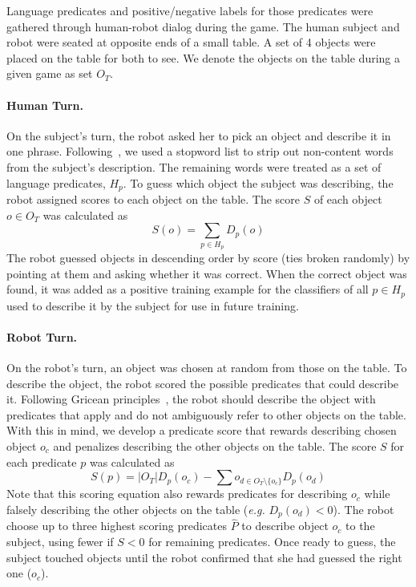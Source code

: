 Language predicates and positive/negative labels for those predicates were gathered through human-robot dialog during the \ispy game.
The human subject and robot were seated at opposite ends of a small table.
A set of 4 objects were placed on the table for both to see.
We denote the objects on the table during a given game as set $O_T$.

\paragraph{Human Turn.} On the subject's turn, the robot asked her to pick an object and describe it in one phrase.
Following~\cite{parde:ijcai15}, we used a stopword list to strip out non-content words from the subject's description.
The remaining words were treated as a set of language predicates, $H_p$.
To guess which object the subject was describing, the robot assigned scores to each object on the table.
The score $S$ of each object $o\in O_T$ was calculated as
\begin{equation}
	S(o) = \sum_{p\in H_p}{D_p(o)}
\end{equation}
The robot guessed objects in descending order by score (ties broken randomly) by pointing at them and asking whether it was correct.
When the correct object was found, it was added as a positive training example for the classifiers of all $p\in H_p$ used to describe it by the subject for use in future training.

\paragraph{Robot Turn.} On the robot's turn, an object was chosen at random from those on the table.
To describe the object, the robot scored the possible predicates that could describe it.
Following Gricean principles~\cite{grice:bkchapter75}, the robot should describe the object with predicates that apply and do not ambiguously refer to other objects on the table.
With this in mind, we develop a predicate score that rewards describing chosen object $o_c$ and penalizes describing the other objects on the table.
The score $S$ for each predicate $p$ was calculated as
\begin{equation}
	S(p) = |O_T|D_p(o_c) - \sum{o_{d\in{O_T}\setminus\{o_c\}}}{D_p(o_d)}
\end{equation}
Note that this scoring equation also rewards predicates for describing $o_c$ while falsely describing the other objects on the table (\textit{e.g.} $D_p(o_d)<0$).
The robot choose up to three highest scoring predicates $\hat{P}$ to describe object $o_c$ to the subject, using fewer if $S<0$ for remaining predicates.
Once ready to guess, the subject touched objects until the robot confirmed that she had guessed the right one ($o_c$).

